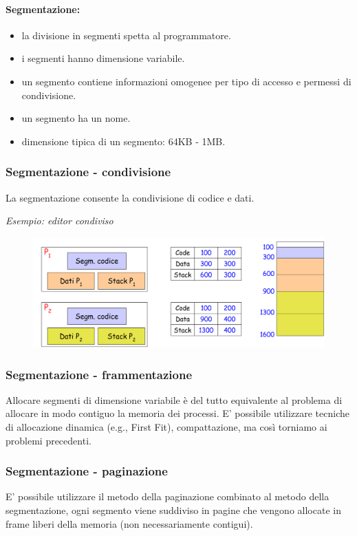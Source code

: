 \paragraph{Segmentazione:}

\begin{itemize}
    \item la divisione in segmenti spetta al programmatore.
    \item  i segmenti hanno dimensione variabile.
    \item un segmento contiene informazioni omogenee per tipo di accesso e permessi di condivisione.
    \item un segmento ha un nome.
    \item dimensione tipica di un segmento: 64KB - 1MB.
\end{itemize}

\subsubsection{Segmentazione - condivisione}
La segmentazione consente la condivisione di codice e dati.

\textit{Esempio: editor condiviso}

\begin{figure} [h]
    \centering
    \includegraphics[width=0.7\linewidth]{Images/Screenshot 2025-01-17 at 16-16-13 so-05-memoria - so-05-memoria.pdf.png}
\end{figure}

\subsubsection{Segmentazione - frammentazione}
Allocare segmenti di dimensione variabile è del tutto equivalente
al problema di allocare in modo contiguo la memoria dei
processi. E' possibile utilizzare  tecniche di allocazione dinamica (e.g., First Fit), compattazione, ma così torniamo ai problemi precedenti.

\subsubsection{Segmentazione - paginazione}
E' possibile utilizzare il metodo della paginazione combinato al metodo della segmentazione, ogni segmento viene suddiviso in pagine che vengono allocate in frame liberi della memoria (non necessariamente contigui).

